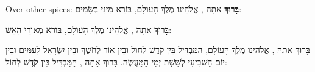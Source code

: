 \begin{seasonal}{Over other spices:}
\textbf{בָּרוּךְ} אַתָּה \Shem{}, אֱלֹהֵינוּ מֶלֶךְ הָעוֹלָם, בּוֹרֵא מִינֵי בְשָׂמִים:
\end{seasonal}

\textbf{בָּרוּךְ} אַתָּה \Shem{}, אֱלֹהֵינוּ מֶלֶךְ הָעוֹלָם, בּוֹרֵא מְאוֹרֵי הָאֵשׁ:

\textbf{בָּרוּךְ} אַתָּה \Shem{}, אֱלֹהֵינוּ מֶלֶךְ הָעוֹלָם, הַמַּבְדִּיל בֵּין קֹדֶשׁ לְחוֹל וּבֵין אוֹר לְחֹשֶׁךְ וּבֵין יִשְׂרָאֵל לָעַמִּים וּבֵין יוֹם הַשְּׁבִיעִי לְשֵׁשֶׁת יְמֵי הַמַּעֲשֶׂה. בָּרוּךְ אַתָּה \Shem{}, הַמַּבְדִּיל בֵּין קֹדֶשׁ לְחוֹל:

